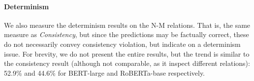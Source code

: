 

\paragraph{Determinism}
We also measure the determinism results on the N-M relations. That is, the same measure as \textit{Consistency}, but since the predictions may be factually correct, these do not necessarily convey consistency violation, but indicate on a determinism issue. For brevity, we do not present the entire results, but the trend is similar to the consistency result (although not comparable, as it inspect different relations): 52.9\% and 44.6\% for BERT-large and RoBERTa-base respectively.













